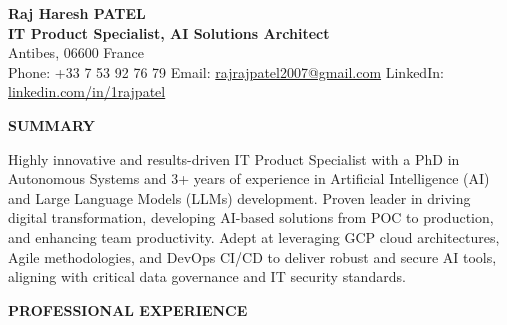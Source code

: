 \documentclass[a4paper,10pt]{article}
\begin{document}
\pagestyle{empty}

\begin{center}
    \textbf{\Large Raj Haresh PATEL} \\
    \vspace{1.5mm}
    \textbf{IT Product Specialist, AI Solutions Architect} \\\vspace{0.75mm}
    Antibes, 06600 France \\ \vspace{0.75mm}
    Phone: +33 7 53 92 76 79 \hspace{2mm} Email: \href{mailto:rajrajpatel2007@gmail.com}{rajrajpatel2007@gmail.com} \hspace{2mm} LinkedIn: \href{https://www.linkedin.com/in/1rajpatel}{linkedin.com/in/1rajpatel}
    \vspace{-3mm} %
\end{center}
\noindent\makebox[\linewidth]{\rule{\paperwidth}{0.4pt}}
\vspace{-2mm} %

\noindent \textbf{SUMMARY}

Highly innovative and results-driven IT Product Specialist with a PhD in Autonomous Systems and 3+ years of experience in Artificial Intelligence (AI) and Large Language Models (LLMs) development. Proven leader in driving digital transformation, developing AI-based solutions from POC to production, and enhancing team productivity. Adept at leveraging GCP cloud architectures, Agile methodologies, and DevOps CI/CD to deliver robust and secure AI tools, aligning with critical data governance and IT security standards.

\vspace{1mm}

\noindent \textbf{PROFESSIONAL EXPERIENCE}
\end{document}
